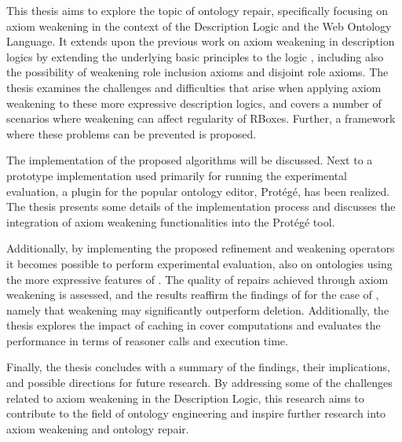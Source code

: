 This thesis aims to explore the topic of ontology repair, specifically focusing on axiom weakening in the context of the \SROIQ Description Logic and the Web Ontology Language. It extends upon the previous work on axiom weakening in description logics by extending the underlying basic principles to the logic \SROIQ, including also the possibility of weakening role inclusion axioms and disjoint role axioms. The thesis examines the challenges and difficulties that arise when applying axiom weakening to these more expressive description logics, and covers a number of scenarios where weakening can affect regularity of \SROIQ RBoxes. Further, a framework where these problems can be prevented is proposed.

The implementation of the proposed algorithms will be discussed. Next to a prototype implementation used primarily for running the experimental evaluation, a plugin for the popular ontology editor, Protégé, has been realized. The thesis presents some details of the implementation process and discusses the integration of axiom weakening functionalities into the Protégé tool.

Additionally, by implementing the proposed refinement and weakening operators it becomes possible to perform experimental evaluation, also on ontologies using the more expressive features of \SROIQ. The quality of repairs achieved through axiom weakening is assessed, and the results reaffirm the findings of \cite{troquard2018repairing} for the case of \SROIQ, namely that weakening may significantly outperform deletion. Additionally, the thesis explores the impact of caching in cover computations and evaluates the performance in terms of reasoner calls and execution time.

Finally, the thesis concludes with a summary of the findings, their implications, and possible directions for future research. By addressing some of the challenges related to axiom weakening in the \SROIQ Description Logic, this research aims to contribute to the field of ontology engineering and inspire further research into axiom weakening and ontology repair.
